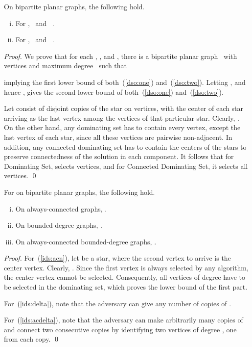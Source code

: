 \begin{proposition}
\label{prop:ds-onopt}
On bipartite planar graphs, the following hold.
\begin{enumerate}[(i)]
\item \label{dso:one} For \ds,
 \, and \, 
.
\item \label{dso:two} For \cds,
 \, and \, 
.
\end{enumerate}
\end{proposition}
\begin{proof}
We prove that for each , , and , there is a
bipartite planar graph~ with  vertices and maximum
degree~ such that 

implying the first lower bound of both~(\ref{dso:one}) and~(\ref{dso:two}).
Letting , and hence , gives the second lower bound of
both~(\ref{dso:one}) and~(\ref{dso:two}).

Let  consist of  disjoint copies of the star on  vertices,
with the center of each star arriving as the last vertex among
the vertices of that particular star.
Clearly, .
On the other hand, any \incr dominating set has to contain
every vertex, except the last vertex of each star, since all
these vertices are pairwise non-adjacent. 
In addition, any \incr connected dominating set
has to contain the centers of the stars
to preserve connectedness of the solution in each component.
It follows that for Dominating Set,
 selects  vertices, and for Connected
Dominating Set, it selects all  vertices. 
\qed\end{proof}


\begin{proposition}
\label{prop:ids-onopt}
For \ids on bipartite planar graphs, the following hold.
\begin{enumerate}[(i)]
\item \label{ids:acn}
 On always-connected graphs, . 
\item \label{ids:delta}
 On bounded-degree graphs, .
\item \label{ids:acdelta}
 On always-connected bounded-degree graphs, .
\end{enumerate}
\end{proposition}
\begin{proof}
For~(\ref{ids:acn}), let  be a star, where the second vertex to
arrive is the center vertex.
Clearly, . 
Since the first vertex is always selected by any \incr
algorithm, the center vertex 
cannot be selected. Consequently, all  vertices of 
degree  have to be selected in the dominating set, which proves
the lower bound of the first part.

For~(\ref{ids:delta}), note that the adversary can
give any number of copies of .

For~(\ref{ids:acdelta}), note that the adversary can
make arbitrarily many copies of  and connect two consecutive copies
by identifying two vertices of degree , one from each copy.
\qed\end{proof}

